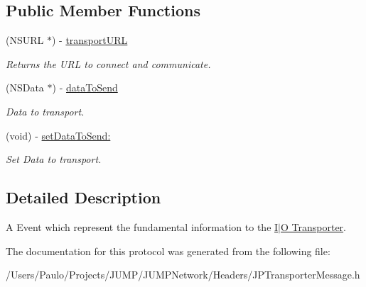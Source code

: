 \subsection*{Public Member Functions}
\begin{DoxyCompactItemize}
\item 
\hypertarget{a00042_a8832d16762be0fa91050304e2d72ebe0}{
(NSURL $\ast$) -\/ \hyperlink{a00042_a8832d16762be0fa91050304e2d72ebe0}{transportURL}}
\label{a00042_a8832d16762be0fa91050304e2d72ebe0}

\begin{DoxyCompactList}\small\item\em Returns the URL to connect and communicate. \item\end{DoxyCompactList}\item 
\hypertarget{a00042_a3bdde47fa8f94d7ed8237b8985808616}{
(NSData $\ast$) -\/ \hyperlink{a00042_a3bdde47fa8f94d7ed8237b8985808616}{dataToSend}}
\label{a00042_a3bdde47fa8f94d7ed8237b8985808616}

\begin{DoxyCompactList}\small\item\em Data to transport. \item\end{DoxyCompactList}\item 
\hypertarget{a00042_acabee3cab759c235f5a719b059c1d752}{
(void) -\/ \hyperlink{a00042_acabee3cab759c235f5a719b059c1d752}{setDataToSend:}}
\label{a00042_acabee3cab759c235f5a719b059c1d752}

\begin{DoxyCompactList}\small\item\em Set Data to transport. \item\end{DoxyCompactList}\end{DoxyCompactItemize}


\subsection{Detailed Description}
A Event which represent the fundamental information to the \hyperlink{a00002}{I$|$O Transporter}. 

The documentation for this protocol was generated from the following file:\begin{DoxyCompactItemize}
\item 
/Users/Paulo/Projects/JUMP/JUMPNetwork/Headers/JPTransporterMessage.h\end{DoxyCompactItemize}
